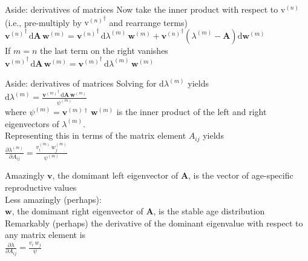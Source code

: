 \documentclass{beamer}
\newcommand{\greekbf}[1]{\boldsymbol{\mathrm{#1}}}
\begin{document}
\begin{frame}{Aside: derivatives of matrices}
  Now take the inner product with respect to $\greekbf{v}^{(n)}$ (i.e., pre-multiply by ${\greekbf{v}^{(n)}}^{\dagger}$ and rearrange terms)\\
  \vspace{.5cm}
  ${\mathbf{v}^{(n)}}^{\dagger} \, \mathrm{d}\mathbf{A} \, \mathbf{w}^{(m)} = {\mathbf{v}^{(n)}}^{\dagger} \, \mathrm{d}\lambda^{(m)} \, \mathbf{w}^{(m)} + {\mathbf{v}^{(n)}}^{\dagger} \left(\lambda^{(m)} - \mathbf{A} \right) \mathrm{d}\mathbf{w}^{(m)}$\\
  \vspace{.5cm}
  If $m=n$ the last term on the right vanishes\\
  \vspace{.5cm}
  ${\mathbf{v}^{(m)}}^{\dagger} \, \mathrm{d}\mathbf{A} \, \mathbf{w}^{(m)} = {\mathbf{v}^{(m)}}^{\dagger} \, \mathrm{d}\lambda^{(m)} \, \mathbf{w}^{(m)}$\\
\end{frame}

\begin{frame}{Aside: derivatives of matrices}
  Solving for $\mathrm{d}\lambda^{(m)}$ yields\\
  \vspace{.5cm}
  $\mathrm{d}\lambda^{(m)} = \frac{{\mathbf{v}^{(m)}}^{\dagger} \, \mathrm{d}\mathbf{A} \, \mathbf{w}^{(m)}}{\psi^{(m)}}$\\
  \vspace{.5cm}
  where $\psi^{(m)}=\mathbf{v}^{(m)\dagger} \, \mathbf{w}^{(m)}$ is the inner product of the left and right eigenvectors of $\lambda^{(m)}$.\\
  \vspace{.5cm}
  Representing this in terms of the matrix element $A_{ij}$ yields\\
  \vspace{.5cm}
  $\frac{\partial \lambda^{(m)}}{\partial A_{ij}} = \frac{v^{(m)}_i \, w^{(m)}_j}{\psi^{(m)}}$
\end{frame}

\begin{frame}{Amazingly}
  $\mathbf{v}$, the domimant left eigenvector of $\mathbf{A}$, is the vector of age-specific reproductive values\\
  \vspace{.5cm}
  Less amazingly (perhaps):\\
  \vspace{.5cm}
  $\mathbf{w}$, the domimant right eigenvector of $\mathbf{A}$, is the stable age distribution\\
  \vspace{.5cm}
  Remarkably (perhaps) the derivative of the dominant eigenvalue with respect to any matrix element is\\
  \vspace{.5cm}
  $\frac{\partial \lambda}{\partial A_{ij}} = \frac{v_i \, w_j}{\psi}$
\end{frame}
\end{document}
